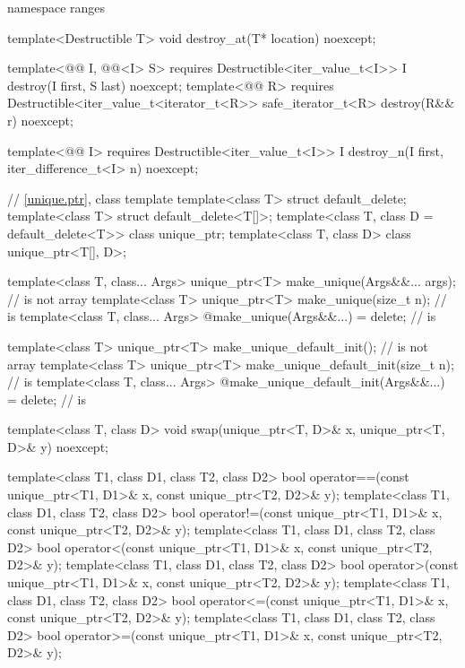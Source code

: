 \begin{codeblock}
{  namespace ranges {
    template<Destructible T>
      void destroy_at(T* location) noexcept;

    template<@@ I, @@<I> S>
      requires Destructible<iter_value_t<I>>
        I destroy(I first, S last) noexcept;
    template<@@ R>
      requires Destructible<iter_value_t<iterator_t<R>>
        safe_iterator_t<R> destroy(R&& r) noexcept;

    template<@@ I>
      requires Destructible<iter_value_t<I>>
        I destroy_n(I first, iter_difference_t<I> n) noexcept;
  }

  // \ref{unique.ptr}, class template 
  template<class T> struct default_delete;
  template<class T> struct default_delete<T[]>;
  template<class T, class D = default_delete<T>> class unique_ptr;
  template<class T, class D> class unique_ptr<T[], D>;

  template<class T, class... Args>
    unique_ptr<T> make_unique(Args&&... args);                                  //  is not array
  template<class T>
    unique_ptr<T> make_unique(size_t n);                                        //  is 
  template<class T, class... Args>
    @\unspecnc@ make_unique(Args&&...) = delete;                                //  is 

  template<class T>
    unique_ptr<T> make_unique_default_init();                                   //  is not array
  template<class T>
    unique_ptr<T> make_unique_default_init(size_t n);                           //  is 
  template<class T, class... Args>
    @\unspecnc@ make_unique_default_init(Args&&...) = delete;                   //  is 

  template<class T, class D>
    void swap(unique_ptr<T, D>& x, unique_ptr<T, D>& y) noexcept;

  template<class T1, class D1, class T2, class D2>
    bool operator==(const unique_ptr<T1, D1>& x, const unique_ptr<T2, D2>& y);
  template<class T1, class D1, class T2, class D2>
    bool operator!=(const unique_ptr<T1, D1>& x, const unique_ptr<T2, D2>& y);
  template<class T1, class D1, class T2, class D2>
    bool operator<(const unique_ptr<T1, D1>& x, const unique_ptr<T2, D2>& y);
  template<class T1, class D1, class T2, class D2>
    bool operator>(const unique_ptr<T1, D1>& x, const unique_ptr<T2, D2>& y);
  template<class T1, class D1, class T2, class D2>
    bool operator<=(const unique_ptr<T1, D1>& x, const unique_ptr<T2, D2>& y);
  template<class T1, class D1, class T2, class D2>
    bool operator>=(const unique_ptr<T1, D1>& x, const unique_ptr<T2, D2>& y);

}
\end{codeblock}
